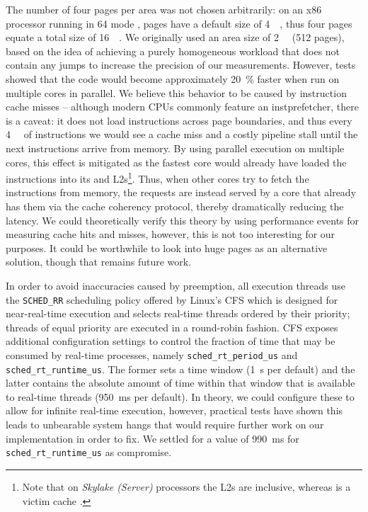 The number of four pages per area was not chosen arbitrarily: on an \gls{x86} processor running in \SI[number-unit-product=-]{64}{\bit} mode \cite{intelsdmsysprogguide}, pages have a default size of \SI{4}{\kibi\byte}, thus four pages equate a total size of \SI{16}{\kibi\byte}. We originally used an area size of \SI{2}{\mebi\byte} (512 pages), based on the idea of achieving a purely homogeneous workload that does not contain any jumps to increase the precision of our measurements. However, tests showed that the code would become approximately \SI{20}{\percent} faster when run on multiple cores in parallel. We believe this behavior to be caused by instruction cache misses -- although modern \glspl{CPU} commonly feature an \gls{instprefetcher}, there is a caveat: it does not load instructions across page boundaries, and thus every \SI{4}{\kibi\byte} of instructions we would see a cache miss and a costly pipeline stall until the next instructions arrive from memory. By using parallel execution on multiple cores, this effect is mitigated as the fastest core would already have loaded the instructions into its  and \glspl{L2}\footnote{Note that on \textit{Skylake (Server)} processors the \glspl{L2} are inclusive, whereas  is a victim cache \cite{intelxeonscalabledeepdive}.}. Thus, when other cores try to fetch the instructions from memory, the requests are instead served by a core that already has them via the cache coherency protocol, thereby dramatically reducing the latency. We could theoretically verify this theory by using performance events for measuring cache hits and misses, however, this is not too interesting for our purposes. It could be worthwhile to look into huge pages as an alternative solution, though that remains future work.

In order to avoid inaccuracies caused by preemption, all execution threads use the \texttt{SCHED\_RR} scheduling policy offered by \gls{Linux}'s \gls{CFS} \cite{cfs} which is designed for near-real-time execution and selects real-time threads ordered by their priority; threads of equal priority are executed in a round-robin fashion. \gls{CFS} exposes additional configuration settings \cite{cfsrt} to control the fraction of time that may be consumed by real-time processes, namely \texttt{sched\_rt\_period\_us} and \texttt{sched\_rt\_runtime\_us}. The former sets a time window (\SI{1}{\second} per default) and the latter contains the absolute amount of time within that window that is available to real-time threads (\SI{950}{\milli\second} per default). In theory, we could configure these to allow for infinite real-time execution, however, practical tests have shown this leads to unbearable system hangs that would require further work on our implementation in order to fix. We settled for a value of \SI{990}{\milli\second} for \texttt{sched\_rt\_runtime\_us} as compromise.

